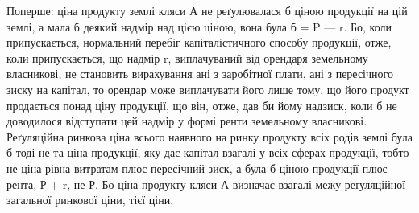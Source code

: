 Поперше: ціна продукту землі кляси А не реґулювалася б ціною продукції
на цій землі, а мала б деякий надмір над цією ціною, вона була б =
P — r. Бо, коли припускається, нормальний перебіг капіталістичного способу
продукції, отже, коли припускається, що надмір r, виплачуваний від орендаря
земельному власникові, не становить вирахування ані з заробітної плати, ані
з пересічного зиску на капітал, то орендар може виплачувати його лише тому,
що його продукт продається понад ціну продукції, що він, отже, дав би йому
надзиск, коли б не доводилося відступати цей надмір у формі ренти земельному
власникові. Реґуляційна ринкова ціна всього наявного на ринку продукту
всіх родів землі була б тоді не та ціна продукції, яку дає капітал взагалі
у всіх сферах продукції, тобто не ціна рівна витратам плюс пересічний
зиск, а була б ціною продукції плюс рента, Р + r, не Р. Бо ціна продукту
кляси А визначає взагалі межу реґуляційної загальної ринкової ціни, тієї ціни,
\parbreak{}  %
